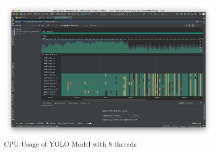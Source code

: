             \begin{figure}[!ht]
                \includegraphics[width=6in]{images/chapter5/YOLO/cpu-usage-8threads.png}
                \caption{CPU Usage of YOLO Model with 8 threads}
                \label{yolo:cpuUsage}
            \end{figure}

